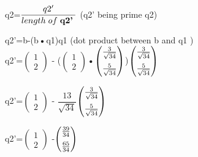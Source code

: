 \documentclass[a4paper,12pt]{article}
\begin{document}
q2=$\dfrac{q2'}{length \hspace{1mm}  of \hspace{1mm} \textbf{q2'} \hspace{1mm} }$      \hspace{4cm}(q2' being prime q2)\\

\vspace{1cm}

q2'=b-(b\textbf{•}q1)q1   \hspace{4cm} (dot product between b and q1 )\\

\vspace{1cm}
q2'=$\begin{pmatrix} 1 \\ 2 \end{pmatrix}$ -  {\huge (}$\begin{pmatrix} 1 \\ 2 \end{pmatrix}$\textbf{•}$\begin{pmatrix} \frac{3}{\sqrt{34}} \vspace*{2mm} \\ \frac{5}{\sqrt{34}} \end{pmatrix}${\huge  )}$\begin{pmatrix} \frac{3}{\sqrt{34}} \vspace*{2mm} \\ \frac{5}{\sqrt{34}} \end{pmatrix}$\\

\vspace{1cm}

q2'=$\begin{pmatrix} 1 \\ 2 \end{pmatrix}$ - $\dfrac{13}{\sqrt{34}}$$\begin{pmatrix} \frac{3}{\sqrt{34}}\vspace*{2mm} \\ \frac{5}{\sqrt{34}} \end{pmatrix}$\\
\vspace{0.5cm}

q2'=$\begin{pmatrix} 1 \\ 2 \end{pmatrix}$ -$\begin{pmatrix} \frac{{\tiny 39}}{{{\tiny 34}}} \vspace*{2mm} \\ \frac{{\tiny 65}}{{{\tiny 34}}} \end{pmatrix}$\\
\vspace{0.5cm}
\end{document}
